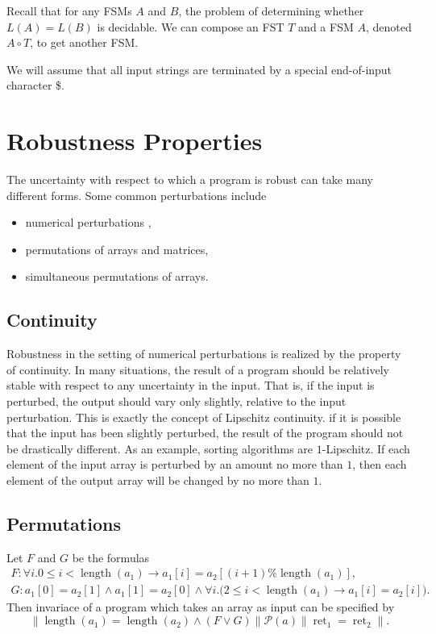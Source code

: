 \documentclass{llncs}
\DeclareMathOperator{\Perm}{Perm}
\DeclareMathOperator{\len}{length}
\DeclareMathOperator{\ret}{ret}
\begin{document}
Recall that for any FSMs $A$ and $B$, the problem of determining whether $L(A) = L(B)$ is decidable. We can compose an FST $T$ and a FSM $A$, denoted $A \circ T$, to get another FSM.

We will assume that all input strings are terminated by a special end-of-input character \$.

\section{Robustness Properties}

The uncertainty with respect to which a program is robust can take many different forms.  Some common perturbations include
\begin{itemize}
\item numerical perturbations \cite{samanta14,chaudhuri10,chaudhuri11},
\item permutations of arrays and matrices,
\item simultaneous permutations of arrays.
\end{itemize}

\subsection{Continuity}

Robustness in the setting of numerical perturbations is realized by the property of continuity.  In many situations, the result of a program should be relatively stable with respect to any uncertainty in the input.  That is, if the input is perturbed, the output should vary only slightly, relative to the input perturbation.  This is exactly the concept of Lipschitz continuity.  if it is possible that the input has been slightly perturbed, the result of the program should not be drastically different.  As an example, sorting algorithms are \(1\)-Lipschitz.  If each element of the input array is perturbed by an amount no more than \(1\), then each element of the output array will be changed by no more than \(1\).

\subsection{Permutations}


Let \(F\) and \(G\) be the formulas
\begin{gather*}
    F:  \forall i. 0 \leq i < \len(a_{1}) \rightarrow a_{1}[i] = a_{2}[(i+1)\%\len(a_{1})],\\
        G: a_{1}[0] = a_{2}[1] \wedge a_{1}[1] = a_{2}[0] \wedge \forall i.\big( 2 \leq i < \len(a_{1}) \rightarrow a_{1}[i] = a_{2}[i] \big).
\end{gather*}
Then invariace of a program which takes an array as input can be specified by
\[\|\len(a_{1}) = \len(a_{2}) \wedge (F \vee G)\| \mathcal{P}(a) \|\ret_{1} = \ret_{2}\|.\]
\end{document}
